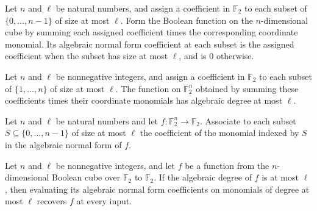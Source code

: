 \begin{theorem}
\leanok
{}
Let $n$ and $\ell$ be natural numbers, and assign a coefficient in $\mathbb F_2$ to each
subset of $\{0,\ldots,n-1\}$ of size at most $\ell$. Form the Boolean function on the
$n$-dimensional cube by summing each assigned coefficient times the corresponding
coordinate monomial. Its algebraic normal form coefficient at each subset is the
assigned coefficient when the subset has size at most $\ell$, and is $0$ otherwise.
\end{theorem}

\begin{theorem}
\leanok
{}
Let $n$ and $\ell$ be nonnegative integers, and assign a coefficient in $\mathbb{F}_2$
to each subset of $\{1,\ldots,n\}$ of size at most $\ell$. The function on
$\mathbb{F}_2^n$ obtained by summing these coefficients times their coordinate monomials
has algebraic degree at most $\ell$.
\end{theorem}

\begin{definition}
\leanok
{}
Let $n$ and $\ell$ be natural numbers and let $f:\mathbb F_2^n\to\mathbb F_2$. Associate
to each subset $S\subseteq\{0,\ldots,n-1\}$ of size at most $\ell$ the coefficient of
the monomial indexed by $S$ in the algebraic normal form of $f$.
\end{definition}

\begin{theorem}
\leanok
{}
Let $n$ and $\ell$ be nonnegative integers, and let $f$ be a function from the
$n$-dimensional Boolean cube over $\mathbb{F}_2$ to $\mathbb{F}_2$. If the algebraic
degree of $f$ is at most $\ell$, then evaluating its algebraic normal form coefficients
on monomials of degree at most $\ell$ recovers $f$ at every input.
\end{theorem}

